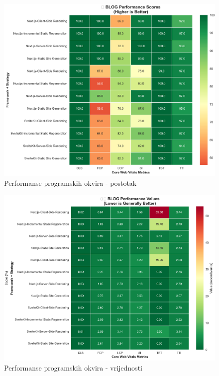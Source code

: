 \begin{figure}[H]
    \centering
    \includegraphics[width=\textwidth]{slike/rezultati/blog/blog_performance_scores.png}
    \caption{Performanse programskih okvira - postotak}
    \label{fig:testiranje-blog-postotak}
\end{figure}

\begin{figure}[H]
    \centering
    \includegraphics[width=\textwidth]{slike/rezultati/blog/blog_performance_values.png}
    \caption{Performanse programskih okvira - vrijednosti}
    \label{fig:testiranje-blog-vrijednosti}
\end{figure}

